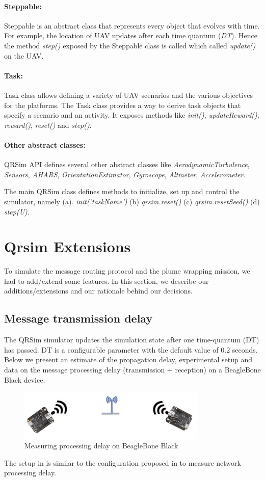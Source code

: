 \paragraph{Steppable:} Steppable is an abstract class that represents every object that evolves with time. For example, the location of UAV updates after each time quantum (\emph{DT}). Hence the method \emph{step()} exposed by the Steppable class is called which called \emph{update()} on the UAV.
\paragraph{Task:}
Task class allows defining a variety of UAV scenarios and the various objectives for the platforms. The Task class provides a way to derive task objects that specify a scenario and an activity. It exposes methods like \emph{init()}, \emph{updateReward()}, \emph{reward()}, \emph{reset()} and \emph{step()}.
\paragraph{Other abstract classes:}
QRSim API defines several other abstract classes like \emph{AerodynamicTurbulence}, \emph{Sensors}, \emph{AHARS}, \emph{OrientationEstimator}, \emph{Gyroscope}, \emph{Altmeter}, \emph{Accelerometer}.

The main QRSim class defines methods to initialize, set up and control the simulator, namely (a). \emph{init('taskName')} (b) \emph{qrsim.reset()} (c) \emph{qrsim.resetSeed()} (d) \emph{step(U)}.

\section{Qrsim Extensions}

To simulate the message routing protocol and the plume wrapping mission, we had to add/extend some features. In this section, we describe our additions/extensions and our rationale behind our decisions.
\subsection{Message transmission delay}
The QRSim simulator updates the simulation state after one time-quantum (DT) has passed. DT is a configurable parameter with the default value of 0.2 seconds. Below we present an estimate of the propagation delay, experimental setup and data on the message processing delay (transmission + reception) on a BeagleBone Black device.
\begin{figure}[hbtp]
\centering
\includegraphics[width=0.8\textwidth]{Chapter-4/figs/beaglebone}
\caption{Measuring processing delay on BeagleBone Black}
\label{fig:proc_delay}
\end{figure}
The setup in  is similar to the configuration proposed in \cite{1378257} to measure network processing delay.

